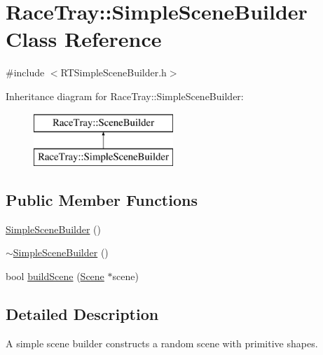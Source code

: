 \hypertarget{class_race_tray_1_1_simple_scene_builder}{\section{Race\-Tray\-:\-:Simple\-Scene\-Builder Class Reference}
\label{class_race_tray_1_1_simple_scene_builder}
}


{\ttfamily \#include $<$R\-T\-Simple\-Scene\-Builder.\-h$>$}

Inheritance diagram for Race\-Tray\-:\-:Simple\-Scene\-Builder\-:\begin{figure}[H]
\begin{center}
\leavevmode
\includegraphics[height=2.000000cm]{class_race_tray_1_1_simple_scene_builder}
\end{center}
\end{figure}
\subsection*{Public Member Functions}
\begin{DoxyCompactItemize}
\item 
\hyperlink{class_race_tray_1_1_simple_scene_builder_adabab20037611d8b93ee191367cff057}{Simple\-Scene\-Builder} ()
\item 
\hyperlink{class_race_tray_1_1_simple_scene_builder_a68f882dca0608b23e6b8fdad7dc22777}{$\sim$\-Simple\-Scene\-Builder} ()
\item 
bool \hyperlink{class_race_tray_1_1_simple_scene_builder_ae4a08c2dae004e17f95a30cbf8249c8b}{build\-Scene} (\hyperlink{class_race_tray_1_1_scene}{Scene} $\ast$scene)
\end{DoxyCompactItemize}


\subsection{Detailed Description}
A simple scene builder constructs a random scene with primitive shapes. 

